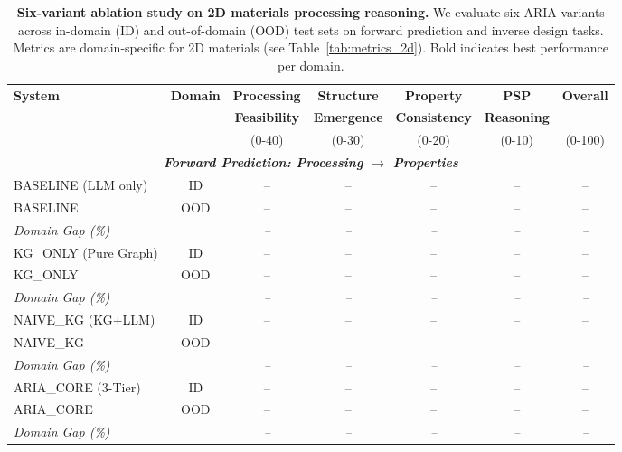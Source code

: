 
\begin{table}[ht!]
\centering
\caption{\textbf{Six-variant ablation study on 2D materials processing reasoning.}
We evaluate six ARIA variants across in-domain (ID) and out-of-domain (OOD) test sets
on forward prediction and inverse design tasks. Metrics are domain-specific for 2D materials
(see Table~\ref{tab:metrics_2d}). Bold indicates best performance per domain.}
\label{tab:ablation_6variants}
\small
\begin{tabular}{lcccccc}
\toprule
\textbf{System} & \textbf{Domain} & \textbf{Processing} & \textbf{Structure} & \textbf{Property} & \textbf{PSP} & \textbf{Overall} \\
& & \textbf{Feasibility} & \textbf{Emergence} & \textbf{Consistency} & \textbf{Reasoning} & \\
& & (0-40) & (0-30) & (0-20) & (0-10) & (0-100) \\
\midrule
\multicolumn{7}{c}{\textit{\textbf{Forward Prediction: Processing $\rightarrow$ Properties}}} \\
\midrule

BASELINE (LLM only) & ID & -- & -- & -- & -- & -- \\
BASELINE & OOD & -- & -- & -- & -- & -- \\
\rowcolor{gray!10}
\textit{Domain Gap (\%)} & & \textit{--} & \textit{--} & \textit{--} & \textit{--} & \textit{--} \\
\midrule

KG\_ONLY (Pure Graph) & ID & -- & -- & -- & -- & -- \\
KG\_ONLY & OOD & -- & -- & -- & -- & -- \\
\rowcolor{gray!10}
\textit{Domain Gap (\%)} & & \textit{--} & \textit{--} & \textit{--} & \textit{--} & \textit{--} \\
\midrule

NAIVE\_KG (KG+LLM) & ID & -- & -- & -- & -- & -- \\
NAIVE\_KG & OOD & -- & -- & -- & -- & -- \\
\rowcolor{gray!10}
\textit{Domain Gap (\%)} & & \textit{--} & \textit{--} & \textit{--} & \textit{--} & \textit{--} \\
\midrule

ARIA\_CORE (3-Tier) & ID & -- & -- & -- & -- & -- \\
ARIA\_CORE & OOD & -- & -- & -- & -- & -- \\
\rowcolor{gray!10}
\textit{Domain Gap (\%)} & & \textit{--} & \textit{--} & \textit{--} & \textit{--} & \textit{--} \\
\midrule


\end{tabular}
\end{table}
